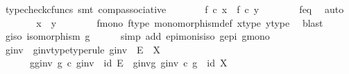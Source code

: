 \begin{isabellebody}
\ {\isacharparenleft}{\kern0pt}typecheck{\isacharunderscore}{\kern0pt}cfuncs{\isacharcomma}{\kern0pt}\ smt\ comp{\isacharunderscore}{\kern0pt}associative{}{\isacharparenright}{\kern0pt}\isanewline
\ \ \ \ \isamarkupfalse%
\ \isamarkupfalse%
\ {\isachardoublequoteopen}f\ {\isasymcirc}\isactrlsub c\ x\ {\isacharequal}{\kern0pt}\ f\ {\isasymcirc}\isactrlsub c\ y{\isachardoublequoteclose}\isanewline
\ \ \ \ \ \ \isamarkupfalse%
\ f{\isacharunderscore}{\kern0pt}eq\ \isamarkupfalse%
\ auto\isanewline
\ \ \ \ \isamarkupfalse%
\ \isamarkupfalse%
\ {\isachardoublequoteopen}x\ {\isacharequal}{\kern0pt}\ y{\isachardoublequoteclose}\isanewline
\ \ \ \ \ \ \isamarkupfalse%
\ f{\isacharunderscore}{\kern0pt}mono\ f{\isacharunderscore}{\kern0pt}type\ monomorphism{\isacharunderscore}{\kern0pt}def{}\ x{\isacharunderscore}{\kern0pt}type\ y{\isacharunderscore}{\kern0pt}type\ \isamarkupfalse%
\ blast\isanewline
\ \ \isamarkupfalse%
\isanewline
\isanewline
\ \ \isamarkupfalse%
\ g{\isacharunderscore}{\kern0pt}iso{\isacharcolon}{\kern0pt}\ {\isachardoublequoteopen}isomorphism\ g{\isachardoublequoteclose}\isanewline
\ \ \ \ \isamarkupfalse%
\ {\isacharparenleft}{\kern0pt}simp\ add{\isacharcolon}{\kern0pt}\ epi{\isacharunderscore}{\kern0pt}mon{\isacharunderscore}{\kern0pt}is{\isacharunderscore}{\kern0pt}iso\ g{\isacharunderscore}{\kern0pt}epi\ g{\isacharunderscore}{\kern0pt}mono{\isacharparenright}{\kern0pt}\isanewline
\ \ \isamarkupfalse%
\ \isamarkupfalse%
\ g{\isacharunderscore}{\kern0pt}inv\ \ g{\isacharunderscore}{\kern0pt}inv{\isacharunderscore}{\kern0pt}type{\isacharbrackleft}{\kern0pt}type{\isacharunderscore}{\kern0pt}rule{\isacharbrackright}{\kern0pt}{\isacharcolon}{\kern0pt}\ {\isachardoublequoteopen}g{\isacharunderscore}{\kern0pt}inv\ {\isacharcolon}{\kern0pt}\ E\ {\isasymrightarrow}\ X{\isachardoublequoteclose}\ \isanewline
\ \ \ \ \ \ g{\isacharunderscore}{\kern0pt}g{\isacharunderscore}{\kern0pt}inv{\isacharcolon}{\kern0pt}\ {\isachardoublequoteopen}g\ {\isasymcirc}\isactrlsub c\ g{\isacharunderscore}{\kern0pt}inv\ {\isacharequal}{\kern0pt}\ id\ E{\isachardoublequoteclose}\ \ g{\isacharunderscore}{\kern0pt}inv{\isacharunderscore}{\kern0pt}g{\isacharcolon}{\kern0pt}\ {\isachardoublequoteopen}g{\isacharunderscore}{\kern0pt}inv\ {\isasymcirc}\isactrlsub c\ g\ {\isacharequal}{\kern0pt}\ id\ X{\isachardoublequoteclose}\isanewline

\end{isabellebody}
